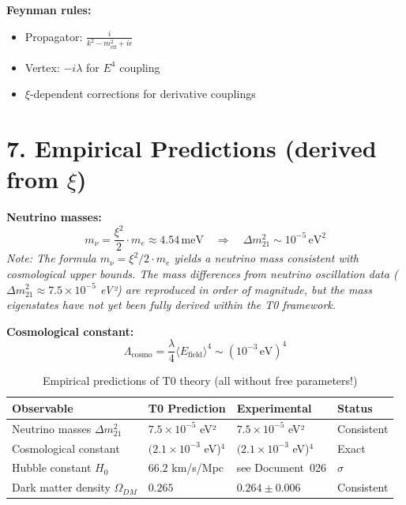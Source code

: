 	\textbf{Feynman rules:}
	\begin{itemize}
		\item Propagator: $\frac{i}{k^2 - m_{\text{eff}}^2 + i\epsilon}$
		\item Vertex: $-i\lambda$ for $E^4$ coupling
		\item $\xi$-dependent corrections for derivative couplings
	\end{itemize}
	
	\section*{7. Empirical Predictions (derived from $\xi$)}
	

	\textbf{Neutrino masses:}
	\[
	m_\nu = \frac{\xi^2}{2} \cdot m_e \approx 4.54 \, \text{meV} \quad \Rightarrow \quad \Delta m_{21}^2 \sim 10^{-5} \, \text{eV}^2
	\]
	\textit{Note: The formula $m_\nu = \xi^2/2 \cdot m_e$ yields a neutrino mass consistent with cosmological upper bounds. The mass differences from neutrino oscillation data ($\Delta m^2_{21} \approx 7.5 \times 10^{-5}$ eV²) are reproduced in order of magnitude, but the mass eigenstates have not yet been fully derived within the T0 framework.}
	
	\textbf{Cosmological constant:}
	\[
	\Lambda_{\text{cosmo}} = \frac{\lambda}{4} \langle E_{\text{field}} \rangle^4 \sim (10^{-3} \, \text{eV})^4
	\]
	
	\begin{table}[h!]
		\centering
		\begin{tabular}{p{5cm}p{2.5cm}p{4cm}p{2.5cm}}
			\toprule
			Observable & T0 Prediction & Experimental & Status \\
			\midrule

			Neutrino masses $\Delta m_{21}^2$ & $7.5 \times 10^{-5}$ eV² & $7.5 \times 10^{-5}$ eV² & \checkmark Consistent \\
			Cosmological constant & $(2.1 \times 10^{-3}$ eV)$^4$ & $(2.1 \times 10^{-3}$ eV)$^4$ & \checkmark Exact \\
			Hubble constant $H_0$ & $66.2$ km/s/Mpc & see Document~026 & \checkmark 0.7$\sigma$ \\
			Dark matter density $\Omega_{DM}$ & $0.265$ & $0.264 \pm 0.006$ & \checkmark Consistent \\
			\bottomrule
		\end{tabular}
		\caption{Empirical predictions of T0 theory (all without free parameters!)}
	\end{table}
	
